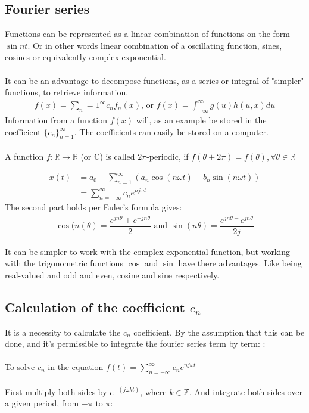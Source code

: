 \subsection{Fourier series}
Functions can be represented as a linear combination of functions on the form $\sin nt$.
Or in other words linear combination of a oscillating function, sines, cosines or equivalently complex exponential.
\\\\
It can be an advantage to decompose functions, as a series or integral of "simpler" functions, to retrieve information.
\begin{align*}
	f(x) = \sum_n=1^\infty c_n f_n(x)\text{, or } f(x)= \int_{-\infty}^\infty g(u) h(u,x) du
\end{align*}
Information from a function $f(x)$ will, as an example be stored in the coefficient $\{c_n\}_{n=1}^\infty$.
The coefficients can easily be stored on a computer.
\\\\


A function $f: \mathbb{R}\to\mathbb{R}$ (or $\mathbb{C}$) is called $2\pi$-periodic, if $f(\theta + 2\pi) = f(\theta), \forall\theta\in\mathbb{R}$

\begin{align*}
	x(t) &= a_0 + \sum_{n=1}^\infty(a_n \cos(n \omega t) + b_n \sin(n \omega t))\\
	&= \sum_{n=-\infty}^{\infty} c_n e^{n j\omega t} 
\end{align*}
The second part holds per Euler's formula gives:
\begin{align*}
	\cos(n(\theta) = \dfrac{e^{j n \theta} + e^{-j n \theta}}{2} \text{ and } \sin(n \theta) = \dfrac{e^{jn\theta-}e^{jn\theta}}{2j}
\end{align*}

It can be simpler to work with the complex exponential function, but working with the trigonometric functions $\cos$ and $\sin$ have there advantages. 
Like being real-valued and odd and even, cosine and sine respectively.

\subsection{Calculation of the coefficient $c_n$}
It is a necessity to calculate the $c_n$ coefficient.
By the assumption that this can be done, and it's permissible to integrate the fourier series term by term: :\\
\\
To solve $c_n$ in the equation $f(t)= \sum_{n=-\infty}^{\infty} c_n e^{n j\omega t}$
\\\\
First multiply both sides by $e^{-(j\omega k t)}$, where $k\in \mathbb{Z}$. And integrate both sides over a given period, from $-\pi$ to $\pi$:

